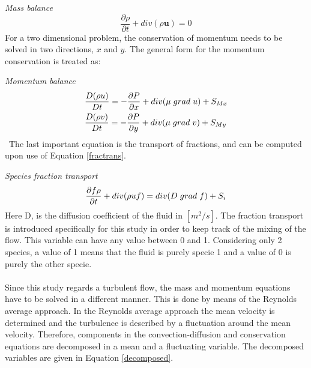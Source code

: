 \documentclass{CFD2017}
\begin{document}
\emph{Mass balance}
\begin{equation}
\label{MassBal}
\frac{\partial \rho }{\partial t} + div(\rho\mathbf u)= 0
\end{equation}
For a two dimensional problem, the conservation of momentum needs to be solved in two directions, $x$ and $y$. The general form for the momentum conservation is treated as:\vspace{2mm}

\emph{Momentum balance}
\begin{equation}
\begin{split}
\label{MomBal}
&\frac{D( \rho u) }{D t} =-\frac{\partial P}{\partial x} + div(\mu \hspace{1mm} grad\hspace{1mm}u)+S_{Mx}\\ 
&\frac{D( \rho v) }{D t} =-\frac{\partial P}{\partial y} + div(\mu \hspace{1mm} grad\hspace{1mm}v)+S_{My}\\ 
\end{split}
\end{equation}\
The last important equation is the transport of fractions, and can be computed upon use of Equation \ref{fractrans}.\vspace{2mm}

\emph{Species fraction transport}
\begin{equation}
\label{fractrans}
\frac{\partial f\rho }{\partial t} +div( \rho \boldmath{u} f) = div(D \hspace{1mm}grad\hspace{1mm}f) +S_i 
\end{equation}
Here D, is the diffusion coefficient of the fluid in $[m^2/s]$. The fraction transport is introduced specifically for this study in order to keep track of the mixing of the flow. This variable can have any value between 0 and 1. Considering only 2 species, a value of 1 means that the fluid is purely specie 1 and a value of 0 is purely the other specie. \\ \\
Since this study regards a turbulent flow, the mass and momentum equations have to be solved in a different manner. This is done by means of the Reynolds average approach. In the Reynolds average approach the mean velocity is determined and the turbulence is described by a fluctuation around the mean velocity. Therefore, components in the convection-diffusion and conservation equations are decomposed in a mean and a fluctuating variable. The decomposed variables are given in Equation \ref{decomposed}.\vspace{2mm}
\end{document}
